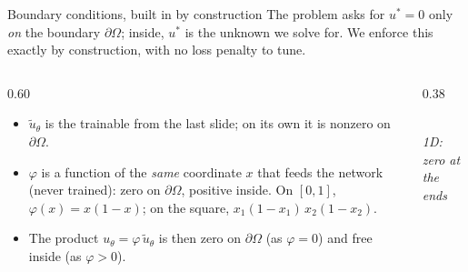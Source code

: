 \documentclass[11pt,aspectratio=169]{beamer}
\begin{document}
\begin{frame}{Boundary conditions, built in by construction}
  The problem asks for $u^* = 0$ only \emph{on} the boundary $\partial\Omega$;
  inside, $u^*$ is the unknown we solve for. We enforce this exactly by
  construction, with no loss penalty to tune.
  \smallskip
  \begin{columns}[c]
    \begin{column}{0.60\textwidth}
      \begin{itemize}\itemsep0.4em
        \item $\tilde{u}_\theta$ is the trainable  from the last
              slide; on its own it is nonzero on $\partial\Omega$.
        \item $\varphi$ is a  function of the \emph{same}
              coordinate $x$ that feeds the network (never trained): zero on
              $\partial\Omega$, positive inside. On $[0,1]$, $\varphi(x) = x(1-x)$;
              on the square, $x_1(1-x_1)\,x_2(1-x_2)$.
        \item The product $u_\theta = \varphi\,\tilde{u}_\theta$ is then zero on
              $\partial\Omega$ (as $\varphi = 0$) and free inside (as $\varphi > 0$).
      \end{itemize}
    \end{column}
    \begin{column}{0.38\textwidth}
      \centering
      \\[4pt]
      {\small\itshape\color{neutral} 1D: zero at the ends}
    \end{column}
  \end{columns}
\end{frame}
\end{document}
